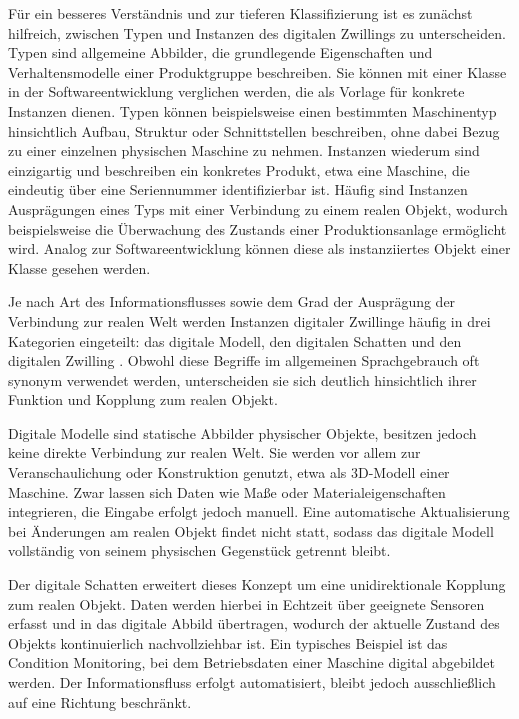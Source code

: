 Für ein besseres Verständnis und zur tieferen Klassifizierung ist es zunächst hilfreich, zwischen Typen und Instanzen des digitalen Zwillings zu unterscheiden.
Typen sind allgemeine Abbilder, die grundlegende Eigenschaften und Verhaltensmodelle einer Produktgruppe beschreiben. 
Sie können mit einer Klasse in der Softwareentwicklung verglichen werden, die als Vorlage für konkrete Instanzen dienen.
Typen können beispielsweise einen bestimmten Maschinentyp hinsichtlich Aufbau, Struktur oder Schnittstellen beschreiben, ohne dabei Bezug zu einer einzelnen physischen Maschine zu nehmen.
Instanzen wiederum sind einzigartig und beschreiben ein konkretes Produkt, etwa eine Maschine, die eindeutig über eine Seriennummer identifizierbar ist.
Häufig sind Instanzen Ausprägungen eines Typs mit einer Verbindung zu einem realen Objekt, wodurch beispielsweise die Überwachung des Zustands einer Produktionsanlage ermöglicht wird.
Analog zur Softwareentwicklung können diese als instanziiertes Objekt einer Klasse gesehen werden. \cite{ZEISS}

Je nach Art des Informationsflusses sowie dem Grad der Ausprägung der Verbindung zur realen Welt werden Instanzen digitaler Zwillinge häufig in drei Kategorien eingeteilt: das digitale Modell, den digitalen Schatten und den digitalen Zwilling \cite{ClassificationDT}.
Obwohl diese Begriffe im allgemeinen Sprachgebrauch oft synonym verwendet werden, unterscheiden sie sich deutlich hinsichtlich ihrer Funktion und Kopplung zum realen Objekt.

Digitale Modelle sind statische Abbilder physischer Objekte, besitzen jedoch keine direkte Verbindung zur realen Welt. 
Sie werden vor allem zur Veranschaulichung oder Konstruktion genutzt, etwa als 3D-Modell einer Maschine. 
Zwar lassen sich Daten wie Maße oder Materialeigenschaften integrieren, die Eingabe erfolgt jedoch manuell. 
Eine automatische Aktualisierung bei Änderungen am realen Objekt findet nicht statt, sodass das digitale Modell vollständig von seinem physischen Gegenstück getrennt bleibt.

Der digitale Schatten erweitert dieses Konzept um eine unidirektionale Kopplung zum realen Objekt. 
Daten werden hierbei in Echtzeit über geeignete Sensoren erfasst und in das digitale Abbild übertragen, wodurch der aktuelle Zustand des Objekts kontinuierlich nachvollziehbar ist. 
Ein typisches Beispiel ist das Condition Monitoring, bei dem Betriebsdaten einer Maschine digital abgebildet werden. 
Der Informationsfluss erfolgt automatisiert, bleibt jedoch ausschließlich auf eine Richtung beschränkt.


